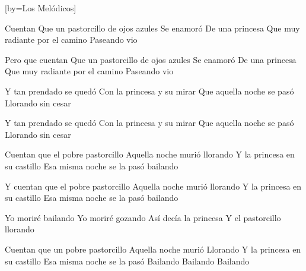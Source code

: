 
[by={Los Melódicos}]
    \usebox{\C} \usebox{\EVII} \usebox{\Am} \usebox{\Dm}
    \usebox{\F} \usebox{\FSus} \usebox{\G}
    
    \beginverse
        Cuentan
        Que un pastorcillo de ojos azules
        Se enamoró
        De una princesa
        Que muy radiante por el camino
        Paseando vio
    \endverse
    
    \beginverse
        Pero que cuentan
        Que un pastorcillo de ojos azules
        Se enamoró
        De una princesa
        Que muy radiante por el camino
        Paseando vio
    \endverse
    
    \beginverse
        Y tan prendado se quedó
        Con la princesa y su mirar
        Que aquella noche se pasó
        Llorando sin cesar
    \endverse
    
    \beginverse
        Y tan prendado se quedó
        Con la princesa y su mirar
        Que aquella noche se pasó
        Llorando sin cesar
    \endverse
    
    \beginverse
        Cuentan que el pobre pastorcillo
        Aquella noche murió llorando
        Y la princesa en su castillo
        Esa misma noche se la pasó bailando
    \endverse
    
    \beginverse
        Y cuentan que el pobre pastorcillo
        Aquella noche murió llorando
        Y la princesa en su castillo
        Esa misma noche se la pasó bailando
    \endverse
    
    \beginverse
        Yo moriré bailando
        Yo moriré gozando
        Así decía la princesa
        Y el pastorcillo llorando
    \endverse
    
    \beginverse
        Cuentan que un pobre pastorcillo
        Aquella noche murió
        Llorando
        Y la princesa en su castillo
        Esa misma noche se la pasó
        Bailando
        Bailando
        Bailando
    \endverse
\endsong

\scleardpage